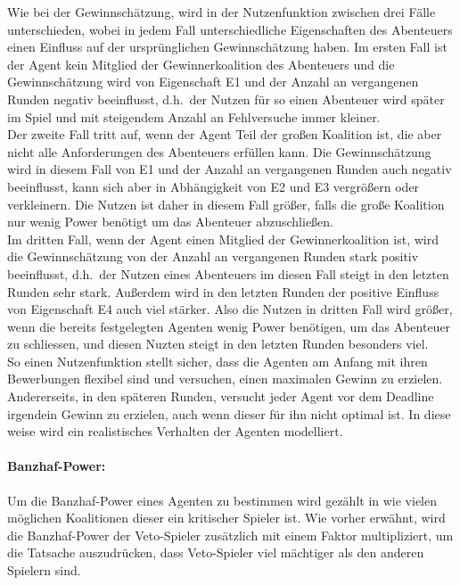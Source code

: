 \documentclass[fleqn,10pt]{SelfArx} %
\begin{document}
Wie bei der Gewinnschätzung, wird in der Nutzenfunktion zwischen drei Fälle unterschieden, wobei in jedem Fall unterschiedliche Eigenschaften des Abenteuers einen Einfluss auf der ursprünglichen Gewinnschätzung haben. Im ersten Fall ist der Agent kein Mitglied der Gewinnerkoalition des Abenteuers und die Gewinnschätzung wird von Eigenschaft E1 und der Anzahl an vergangenen Runden negativ beeinflusst, d.h.\ der Nutzen für so einen Abenteuer wird später im Spiel und mit steigendem Anzahl an Fehlversuche immer kleiner. \\
Der zweite Fall tritt auf, wenn der Agent Teil der großen Koalition ist, die aber nicht alle Anforderungen des Abenteuers erfüllen kann. Die Gewinnschätzung wird in diesem Fall von E1 und der Anzahl an vergangenen Runden auch negativ beeinflusst, kann sich aber in Abhängigkeit von E2 und E3 vergrößern oder verkleinern. Die Nutzen ist daher in diesem Fall größer, falls die große Koalition nur wenig Power benötigt um das Abenteuer abzuschließen. \\
Im dritten Fall, wenn der Agent einen Mitglied der Gewinnerkoalition ist, wird die Gewinnschätzung von der Anzahl an vergangenen Runden stark positiv beeinflusst, d.h.\ der Nutzen eines Abenteuers im diesen Fall steigt in den letzten Runden sehr stark. Außerdem wird in den letzten Runden der positive Einfluss von Eigenschaft E4 auch viel stärker. Also die Nutzen in dritten Fall wird größer, wenn die bereits festgelegten Agenten wenig Power benötigen, um das Abenteuer zu schliessen, und diesen Nuzten steigt in den letzten Runden besonders viel.\\
So einen Nutzenfunktion stellt sicher, dass die Agenten am Anfang mit ihren Bewerbungen flexibel sind und versuchen, einen maximalen Gewinn zu erzielen. Andererseits, in den späteren Runden, versucht jeder Agent vor dem Deadline irgendein Gewinn zu erzielen, auch wenn dieser für ihn nicht optimal ist. In diese weise wird ein realistisches Verhalten der Agenten modelliert. 


\paragraph{Banzhaf-Power:}
Um die Banzhaf-Power eines Agenten zu bestimmen wird gezählt in wie vielen möglichen Koalitionen dieser ein kritischer Spieler ist. Wie vorher erwähnt, wird die Banzhaf-Power der Veto-Spieler zusätzlich mit einem Faktor multipliziert, um die Tatsache auszudrücken, dass Veto-Spieler viel mächtiger als den anderen Spielern sind.
\end{document}
